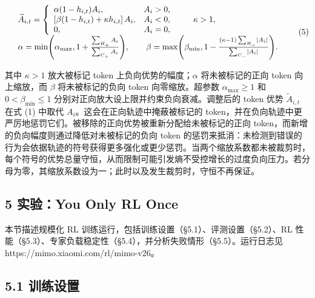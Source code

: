 \[
\begin{array} { r l } & { \widetilde { A } _ { i , t } = \left\{ \begin{array} { l l } { \alpha ( 1 - h _ { i , t } ) A _ { i } , } & { A _ { i } > 0 , } \\ { \left[ \beta ( 1 - h _ { i , t } ) + \kappa h _ { i , t } \right] A _ { i } , } & { A _ { i } < 0 , } \\ { 0 , } & { A _ { i } = 0 , } \end{array} \right. \qquad \kappa > 1 , } \\ & { \alpha = \operatorname* { m i n } \Biggl ( \alpha _ { \operatorname* { m a x } } , 1 + \frac { \sum _ { H _ { + } } A _ { i } } { \sum _ { C _ { + } } A _ { i } } \Biggr ) , \qquad \beta = \operatorname* { m a x } \Biggl ( \beta _ { \operatorname* { m i n } } , 1 - \frac { \left( \kappa - 1 \right) \sum _ { H _ { - } } \left| A _ { i } \right| } { \sum _ { C _ { - } } \left| A _ { i } \right| } \Biggr ) . } \end{array}\tag{5}
\]

其中 \(\kappa > 1\) 放大被标记 token 上负向优势的幅度；\(\alpha\) 将未被标记的正向 token 向上缩放，而 \(\beta\) 将未被标记的负向 token 向零缩放。超参数 \(\alpha _ { \operatorname* { m a x } } \geq 1\) 和 \(0 < \beta _ { \mathrm { m i n } } \le 1\) 分别对正向放大设上限并约束负向衰减。调整后的 token 优势 \(\widetilde { A } _ { i , t }\) 在式 (1) 中取代 \(A _ { i }\)。这会在正向轨迹中掩蔽被标记的 token，并在负向轨迹中更严厉地惩罚它们。被移除的正向优势被重新分配给未被标记的正向 token，而新增的负向幅度则通过降低对未被标记的负向 token 的惩罚来抵消：未检测到错误的行为会依据轨迹的符号获得更多强化或更少惩罚。当两个缩放系数都未被裁剪时，每个符号的优势总量守恒，从而限制可能引发熵不受控增长的过度负向压力。若分母为零，其缩放系数设为一；此时以及发生裁剪时，守恒不再保证。

\subsection{5 实验：You Only RL Once}\label{experiments-you-only-rl-once}

本节描述规模化 RL 训练运行，包括训练设置（§5.1）、评测设置（§5.2）、RL 性能（§5.3）、专家负载稳定性（§5.4），并分析失败情形（§5.5）。运行日志见 https://mimo.xiaomi.com/rl/mimo-v26。

\subsection{5.1 训练设置}\label{training-setup}

